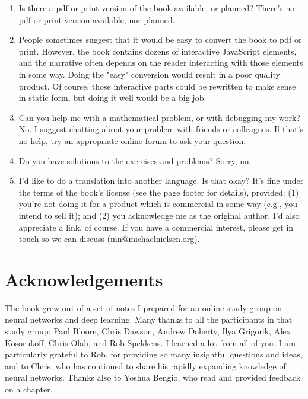 \begin{enumerate}

\item
Is there a pdf or print version of the book available, or planned? There's no pdf or print version available, nor planned.

\item
People sometimes suggest that it would be easy to convert the book to pdf or print. However, the book contains dozens of interactive JavaScript elements, and the narrative often depends on the reader interacting with those elements in some way. Doing the "easy" conversion would result in a poor quality product. Of course, those interactive parts could be rewritten to make sense in static form, but doing it well would be a big job.

\item
Can you help me with a mathematical problem, or with debugging my work? No. I suggest chatting about your problem with friends or colleagues. If that's no help, try an appropriate online forum to ask your question.

\item
Do you have solutions to the exercises and problems? Sorry, no.

\item
I'd like to do a translation into another language. Is that okay? It's fine under the terms of the book's license (see the page footer for details), provided: (1) you're not doing it for a product which is commercial in some way (e.g., you intend to sell it); and (2) you acknowledge me as the original author. I'd also appreciate a link, of course. If you have a commercial interest, please get in touch so we can discuss (mn@michaelnielsen.org).
\end{enumerate}

\section*{Acknowledgements}

The book grew out of a set of notes I prepared for an online study group on neural networks and deep learning. Many thanks to all the participants in that study group: Paul Bloore, Chris Dawson, Andrew Doherty, Ilya Grigorik, Alex Kosorukoff, Chris Olah, and Rob Spekkens. I learned a lot from all of you. I am particularly grateful to Rob, for providing so many insightful questions and ideas, and to Chris, who has continued to share his rapidly expanding knowledge of neural networks. Thanks also to Yoshua Bengio, who read and provided feedback on a chapter.

